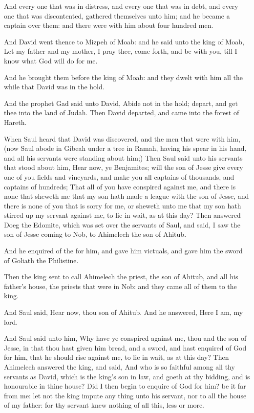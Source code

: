 \Verse And every one that was in distress, and every one that was in debt, and every one that was discontented, gathered themselves unto him; and he became a captain over them: and there were with him about four hundred men.

\Verse And David went thence to Mizpeh of Moab: and he said unto the king of Moab, Let my father and my mother, I pray thee, come forth, and be with you, till I know what God will do for me.

\Verse And he brought them before the king of Moab: and they dwelt with him all the while that David was in the hold.

\Verse And the prophet Gad said unto David, Abide not in the hold; depart, and get thee into the land of Judah. Then David departed, and came into the forest of Hareth.

\Verse When Saul heard that David was discovered, and the men that were with him, (now Saul abode in Gibeah under a tree in Ramah, having his spear in his hand, and all his servants were standing about him;) \Verse Then Saul said unto his servants that stood about him, Hear now, ye Benjamites; will the son of Jesse give every one of you fields and vineyards, and make you all captains of thousands, and captains of hundreds; \Verse That all of you have conspired against me, and there is none that sheweth me that my son hath made a league with the son of Jesse, and there is none of you that is sorry for me, or sheweth unto me that my son hath stirred up my servant against me, to lie in wait, as at this day?  \Verse Then answered Doeg the Edomite, which was set over the servants of Saul, and said, I saw the son of Jesse coming to Nob, to Ahimelech the son of Ahitub.

\Verse And he enquired of the \LORD for him, and gave him victuals, and gave him the sword of Goliath the Philistine.

\Verse Then the king sent to call Ahimelech the priest, the son of Ahitub, and all his father's house, the priests that were in Nob: and they came all of them to the king.

\Verse And Saul said, Hear now, thou son of Ahitub. And he answered, Here I am, my lord.

\Verse And Saul said unto him, Why have ye conspired against me, thou and the son of Jesse, in that thou hast given him bread, and a sword, and hast enquired of God for him, that he should rise against me, to lie in wait, as at this day?  \Verse Then Ahimelech answered the king, and said, And who is so faithful among all thy servants as David, which is the king's son in law, and goeth at thy bidding, and is honourable in thine house?  \Verse Did I then begin to enquire of God for him? be it far from me: let not the king impute any thing unto his servant, nor to all the house of my father: for thy servant knew nothing of all this, less or more.


